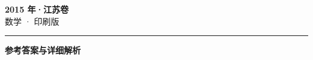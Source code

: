 \documentclass[zihao=5, a4paper]{ctexart}
\begin{document}
\begin{center}
  {\Large\bfseries 2015 年·江苏卷}\\[4pt]
  {\large 数学 · 印刷版}
\end{center}
\medskip
{}

\par\bigskip\hrule\bigskip
{}
\begin{center}{\large\bfseries 参考答案与详细解析}\end{center}
\smallskip

\end{document}
